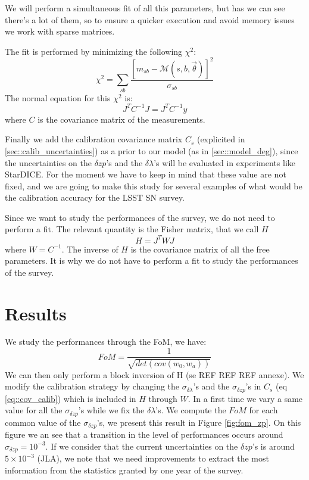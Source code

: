\documentclass[\docopts]{\docclass}
\begin{document}
We will perform a simultaneous fit of all this parameters, but has we can see there's a lot of them, so to ensure a quicker execution and avoid memory issues we work with sparse matrices.

The fit is performed by minimizing the following $\chi^2$:
\begin{equation}
\chi^2 = \sum_{sb}\frac{[m_{sb} - \mathcal{M}(s, b, \vec\theta)]^2}{\sigma_{sb}}
\end{equation}
The normal equation for this $\chi^2$ is:
\begin{equation}
J^TC^{-1}J = J^TC^{-1}y
\end{equation}
where $C$ is the covariance matrix of the measurements.

Finally we add the calibration covariance matrix $C_s$ (explicited in \ref{sec::calib_uncertainties}) as a prior to our model (as in \ref{sec::model_deg}), since the uncertainties on the $\delta zp$'s and the $\delta \lambda$'s will be evaluated in experiments like StarDICE. For the moment we have to keep in mind that these value are not fixed, and we are going to make this study for several examples of what would be the calibration accuracy for the LSST SN survey.

Since we want to study the performances of the survey, we do not need to perform a fit.
The relevant quantity is the Fisher matrix, that we call $H$
\begin{equation}
H = J^TWJ
\end{equation}
where $W = C^{-1}$.
The inverse of $H$ is the covariance matrix of all the free parameters. It is why we do not have to perform a fit to study the performances of the survey.


\section{Results}
\label{sec::results}
We study the performances through the FoM, we have:
\begin{equation}
FoM = \frac{1}{\sqrt{det(cov(w_0, w_a))}}
\end{equation}
We can then only perform a block inversion of H (se REF REF REF annexe).
We modify the calibration strategy by changing the $\sigma_{\delta \lambda}$'s and the $\sigma_{\delta zp}$'s in $C_s$ (eq \ref{eq::cov_calib}) which is included in $H$ through $W$.
In a first time we vary a same value for all the $\sigma_{\delta zp}$'s while we fix the $\delta \lambda$'s.
We compute the $FoM$ for each common value of the $\sigma_{\delta zp}$'s, we present this result in Figure \ref{fig:fom_zp}.
On this figure we an see that a transition in the level of performances occurs around $\sigma_{\delta zp} = 10^{-3}$.
If we consider that the current uncertainties on the $\delta zp$'s is around $5 \times 10^{-3}$ (JLA), we note that we need improvements to extract the most information from the statistics granted by one year of the survey.
\end{document}
